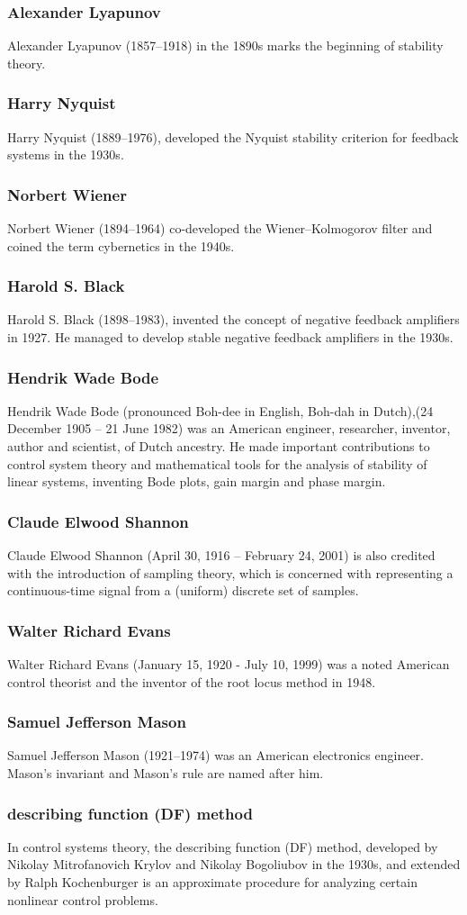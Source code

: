 \documentclass{beamer}
\begin{document}
\begin{frame}
\frametitle{Alexander Lyapunov}
\label{sec-2-6}

   Alexander Lyapunov (1857–1918) in the 1890s marks the beginning of stability theory.
\end{frame}
\begin{frame}
\frametitle{Harry Nyquist}
\label{sec-2-7}

   Harry Nyquist (1889–1976), developed the Nyquist stability criterion for feedback systems in the 1930s.
\end{frame}
\begin{frame}
\frametitle{Norbert Wiener}
\label{sec-2-8}

   Norbert Wiener (1894–1964) co-developed the Wiener–Kolmogorov filter and coined the term cybernetics in the 1940s.
\end{frame}
\begin{frame}
\frametitle{Harold S. Black}
\label{sec-2-9}

   Harold S. Black (1898–1983), invented the concept of negative feedback amplifiers in 1927. He managed to develop stable negative feedback amplifiers in the 1930s.
\end{frame}
\begin{frame}
\frametitle{Hendrik Wade Bode}
\label{sec-2-10}

   Hendrik Wade Bode (pronounced Boh-dee in English, Boh-dah in Dutch),(24 December 1905 – 21 June 1982) was an American engineer, researcher, inventor, author and scientist, of Dutch ancestry.
   He made important contributions to control system theory and mathematical tools for the analysis of stability of linear systems, inventing Bode plots, gain margin and phase margin.
\end{frame}
\begin{frame}
\frametitle{Claude Elwood Shannon}
\label{sec-2-11}

   Claude Elwood Shannon (April 30, 1916 – February 24, 2001) is also credited with the introduction of sampling theory, which is concerned with representing a continuous-time signal from a (uniform) discrete set of samples. 
\end{frame}
\begin{frame}
\frametitle{Walter Richard Evans}
\label{sec-2-12}

   Walter Richard Evans (January 15, 1920 - July 10, 1999) was a noted American control theorist and the inventor of the root locus method in 1948. 
\end{frame}
\begin{frame}
\frametitle{Samuel Jefferson Mason}
\label{sec-2-13}

   Samuel Jefferson Mason (1921–1974) was an American electronics engineer. Mason's invariant and Mason's rule are named after him.
\end{frame}
\begin{frame}
\frametitle{describing function (DF) method}
\label{sec-2-14}

   In control systems theory, the describing function (DF) method, developed by Nikolay Mitrofanovich Krylov and Nikolay Bogoliubov in the 1930s, and extended by Ralph Kochenburger is an approximate procedure for analyzing certain nonlinear control problems.
\end{frame}
\end{document}
